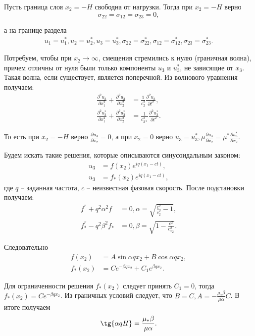 Пусть граница слоя $x_2 = -H$ свободна от нагрузки. Тогда при $x_2 = -H$ верно
\begin{equation}
\sigma_{22} = \sigma_{12} = \sigma_{23} = 0,
\end{equation}

а на границе раздела
\begin{align}
u_1 = u_1^*, u_2 = u_2^*, u_3 = u_3^*,
\sigma_{22} = \sigma_{22}^*, \sigma_{12} = \sigma_{12}^*, \sigma_{23} = \sigma_{23}^*.
\end{align}

Потребуем, чтобы при $x_2 \to \infty$, смещения стремились к нулю (граничная волна), причем отличны от нуля были только компоненты $u_3$ и $u_3^*$, не зависящие от $x_3$. Такая волна, если существует, является поперечной. Из волнового уравнения получаем:
\begin{align}
\frac{\partial^2 u_3}{\partial x_1^2} + \frac{\partial^2 u_3}{\partial x_2^2} &= \frac{1}{c_2^2} \frac{\partial^2 u_3}{\partial t^2}, \nonumber\\
\frac{\partial^2 u_3^*}{\partial x_1^2} + \frac{\partial^2 u_3^*}{\partial x_2^2} &= \frac{1}{c_{2*}^2} \frac{\partial^2 u_3^*}{\partial t^2}.
\end{align}

То есть при $x_2 = -H$ верно $\frac{\partial u_3}{\partial x_2} = 0$, а при $x_2 = 0$ верно $u_3 = u_3^*, \mu\frac{\partial u_3}{\partial x_2} = \mu^*\frac{\partial u_3^*}{\partial x_2}$.

Будем искать такие решения, которые описываются синусоидальным законом:
\begin{align}
u_3 &= f(x_2)e^{iq(x_1-ct)}, \nonumber\\
u_3 &= f_*(x_2)e^{iq(x_1-ct)},
\end{align}
где $q$ -- заданная частота, $c$ -- неизвестная фазовая скорость. После подстановки получаем:
\begin{align}
f^{''} + q^2 \alpha^2 f &= 0, \alpha = \sqrt{\frac{c^2}{c_2^2} - 1}, \nonumber\\
f_*^{''} - q^2 \beta^2 f_* &= 0, \beta = \sqrt{1 - \frac{c^2}{c_{*2}^2}}.
\end{align}

Следовательно
\begin{align}
f(x_2) &= A\sin{\alpha q x_2} + B\cos{\alpha q x_2}, \nonumber\\
f_*(x_2) &= Ce^{-\beta q x_2} + C_1e^{\beta q x_2}.
\end{align}

Для ограниченности решения $f_*(x_2)$ следует принять $C_1 = 0$, тогда $f_*(x_2) = Ce^{-\beta q x_2}$. Из граничных условий следует, что $B = C, A = - \frac{\mu_* \beta}{\mu \alpha}C$. В итоге получаем
\begin{align}
\tg{\alpha qH} = \frac{\mu_* \beta}{\mu \alpha}.
\end{align}

